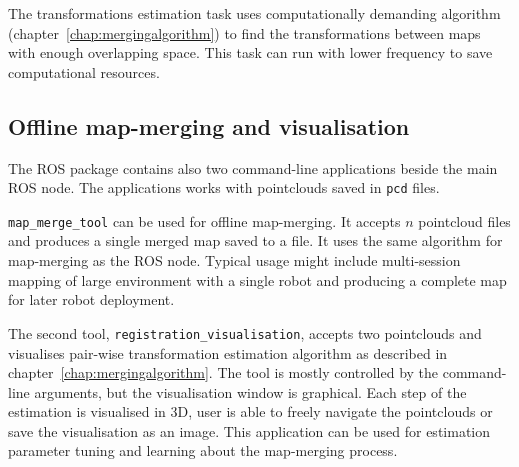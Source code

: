 The transformations estimation task uses computationally demanding algorithm (chapter~\ref{chap:mergingalgorithm}) to find the transformations between maps with enough overlapping space. This task can run with lower frequency to save computational resources.

\subsection{Offline map-merging and visualisation}
\label{sec:commandline-tools}

The \gls{ROS} package contains also two command-line applications beside the main \gls{ROS} node. The applications works with pointclouds saved in \texttt{pcd} files.

\texttt{map\_merge\_tool} can be used for offline map-merging. It accepts $n$ pointcloud files and produces a single merged map saved to a file. It uses the same algorithm for map-merging as the \gls{ROS} node. Typical usage might include multi-session mapping of large environment with a single robot and producing a complete map for later robot deployment.

The second tool, \texttt{registration\_visualisation}, accepts two pointclouds and visualises pair-wise transformation estimation algorithm as described in chapter~\ref{chap:mergingalgorithm}. The tool is mostly controlled by the command-line arguments, but the visualisation window is graphical. Each step of the estimation is visualised in \gls{3D}, user is able to freely navigate the pointclouds or save the visualisation as an image. This application can be used for estimation parameter tuning and learning about the map-merging process.


